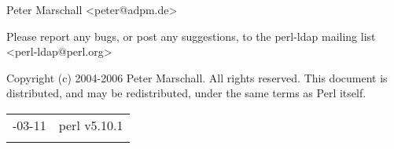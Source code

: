 \documentclass[]{article}
\begin{document}

Peter Marschall \textless{}peter@adpm.de\textgreater{}

Please report any bugs, or post any suggestions, to the perl-ldap
mailing list \textless{}perl-ldap@perl.org\textgreater{}


Copyright (c) 2004-2006 Peter Marschall. All rights reserved. This
document is distributed, and may be redistributed, under the same terms
as Perl itself.

\begin{longtable}[c]{@{}ll@{}}
\toprule\addlinespace
2010-03-11 & perl v5.10.1
\\\addlinespace
\bottomrule
\end{longtable}
\end{document}
